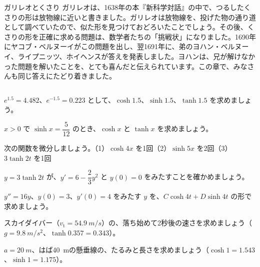 \begin{column}{ガリレオとくさり}
ガリレオは、1638年の本『新科学対話』の中で、つるしたくさりの形は放物線に近いと書きました。ガリレオは放物線を、投げた物の通り道として調べていたので、似た形を見つけておどろいたことでしょう。その後、くさりの形を正確に求める問題は、数学者たちの「挑戦状」になりました。1690年にヤコブ・ベルヌーイがこの問題を出し、翌1691年に、弟のヨハン・ベルヌーイ、ライプニッツ、ホイヘンスが答えを発表しました。ヨハンは、兄が解けなかった問題を解いたことを、とても喜んだと伝えられています。この章で、みなさんも同じ答えにたどり着きました。
\end{column}

\bkendproblems
{}

\bkproblem $e^{1.5}=4.482$、$e^{-1.5}=0.223$ として、$\cosh1.5$、$\sinh1.5$、$\tanh1.5$ を求めましょう。

\bkproblem $x>0$ で $\sinh x=\dfrac{5}{12}$ のとき、$\cosh x$ と $\tanh x$ を求めましょう。

\bkproblem 次の関数を微分しましょう。\newline（1）$\cosh4x$ を1回\quad（2）$\sinh5x$ を2回\quad（3）$3\tanh2t$ を1回

\bkproblem $y=3\tanh2t$ が、$y'=6-\dfrac{2}{3}y^2$ と $y(0)=0$ をみたすことを確かめましょう。

\bkproblem $y''=16y$、$y(0)=3$、$y'(0)=4$ をみたす $y$ を、$C\cosh4t+D\sinh4t$ の形で求めましょう。

\bkproblem スカイダイバー（$v_{\mathrm t}=\qty{54.9}{m/s}$）の、落ち始めて2秒後の速さを求めましょう（$g=\qty{9.8}{m/s^2}$、$\tanh0.357=0.343$）。

\bkproblem $a=\qty{20}{m}$、はば\qty{40}{m}の懸垂線の、たるみと長さを求めましょう（$\cosh1=1.543$、$\sinh1=1.175$）。

